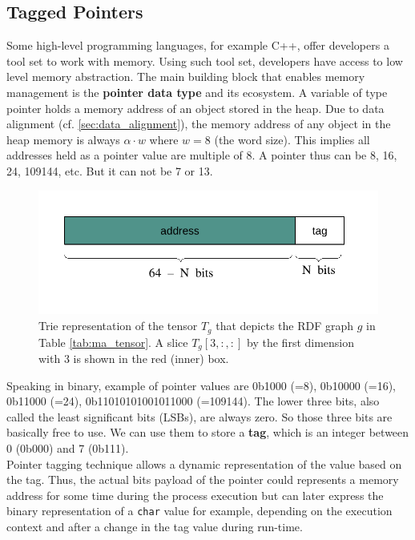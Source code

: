 \subsection{Tagged Pointers}
Some high-level programming languages, for example C++, offer developers a tool set to work with memory. Using such tool set, developers have access to low level memory abstraction. The main building block that enables memory management is the \textbf{pointer data type} and its ecosystem. A variable of type pointer holds a memory address of an object stored in the heap. Due to data alignment (cf. \ref{sec:data_alignment}), the memory address of any object in the heap memory is always $\alpha\cdot w$ where $w=8$ (the word size). This implies all addresses held as a pointer value are multiple of 8. A pointer thus can be 8, 16, 24, 109144, etc. But it can not be 7 or 13. \\

\begin{figure}
	\centering
	\includegraphics[scale=1]{figures/chapter2/pointervalue}
	\caption{Trie representation of the tensor $T_g$ that depicts the RDF graph $g$ in  Table \ref{tab:ma_tensor}. A slice $T_g[3, :, :]$ by the first dimension with 3 is shown in the red (inner) box.}
	\label{fig:tagged_pointer}
\end{figure}


Speaking in binary, example of pointer values are 0b1000 (=8), 0b10000 (=16), 0b11000 (=24), 0b11010101001011000 (=109144). The lower three bits, also called the least significant bits (LSBs), are always zero. So those three bits are basically free to use. We can use them to store a \textbf{tag}, which is an integer between 0 (0b000) and 7 (0b111).  \\ 

Pointer tagging technique allows a dynamic representation of the value based on the tag. Thus, the actual bits payload of the pointer could represents a memory address for some time during the process execution but can later express the binary representation of a \texttt{char} value for example, depending on the execution context and after a change in the tag value during run-time. \\

